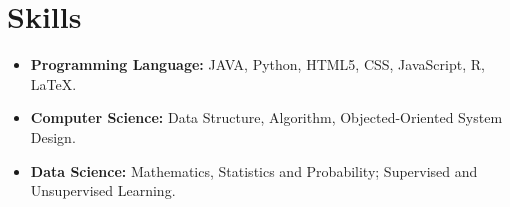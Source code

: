 \documentclass[letterpaper,10pt]{article}
\begin{document}
\section{Skills}
\begin{itemize}[align=left]\setlength\itemsep{0em}
  \item \textbf{Programming Language:} JAVA, Python, HTML5, CSS, JavaScript, R, \LaTeX.
  
  \item \textbf{Computer Science:} Data Structure, Algorithm, Objected-Oriented System Design. 
   
  \item \textbf{Data Science:} Mathematics, Statistics and Probability; Supervised and Unsupervised Learning.
  
\end{itemize}






\end{document}
